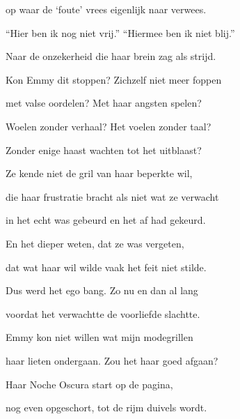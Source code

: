 op waar de ‘foute’ vrees
eigenlijk naar verwees.

“Hier ben ik nog niet vrij.”
“Hiermee ben ik niet blij.”

Naar de onzekerheid
die haar brein zag als strijd.

Kon Emmy dit stoppen?
Zichzelf niet meer foppen

met valse oordelen?
Met haar angsten spelen?

Woelen zonder verhaal?
Het voelen zonder taal?

Zonder enige haast
wachten tot het uitblaast?

Ze kende niet de gril
van haar beperkte wil,

die haar frustratie bracht
als niet wat ze verwacht

in het echt was gebeurd
en het af had gekeurd.

En het dieper weten,
dat ze was vergeten,

dat wat haar wil wilde
vaak het feit niet stilde.

Dus werd het ego bang.
Zo nu en dan al lang

voordat het verwachtte
de voorliefde slachtte.

Emmy kon niet willen
wat mijn modegrillen

haar lieten ondergaan.
Zou het haar goed afgaan?

Haar Noche Oscura
start op de pagina,

nog even opgeschort,
tot de rijm duivels wordt.
